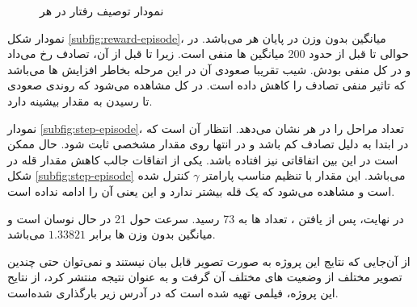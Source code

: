 \begin{figure}
	\centering
	\caption{نمودار توصیف رفتار  در هر }
	\label{fig:episode-chart}
\end{figure}

نمودار شکل \ref{subfig:reward-episode}، میانگین بدون وزن  در پایان هر  می‌باشد. در حوالی تا قبل از حدود 200 میانگین  ها منفی است. زیرا تا قبل از آن، تصادف رخ می‌داد و در کل منفی بودش. شیب تقریبا صعودی آن در این مرحله بخاطر افزایش ها می‌باشد که تاثیر منفی تصادف را کاهش داده است. در کل مشاهده می‌شود که روندی صعودی تا رسیدن به مقدار بیشینه  دارد.

نمودار \ref{subfig:step-episode}، تعداد مراحل را در هر  نشان می‌دهد. انتظار آن است که در ابتدا به دلیل تصادف کم باشد و در انتها روی مقدار مشخصی ثابت شود. حال ممکن است در این بین اتفاقاتی نیز افتاده باشد. یکی از اتفاقات جالب کاهش مقدار قله در شکل \ref{subfig:step-episode} می‌باشد. این مقدار با تنظیم مناسب پارامتر $\gamma$ کنترل شده است و مشاهده می‌شود که یک قله بیشتر ندارد و این یعنی آن  را ادامه نداده است.

در نهایت، پس از یافتن ، تعداد ها به 73 رسید. سرعت  حول 21 در حال نوسان است و میانگین بدون وزن ها برابر $1.33821$ می‌باشد.

از آن‌جایی که نتایج این پروژه به صورت تصویر قابل بیان نیستند و نمی‌توان حتی چندین تصویر مختلف از وضعیت های مختلف آن گرفت و به عنوان نتیجه منتشر کرد، 
از نتایح این پروژه، فیلمی تهیه شده است که در آدرس زیر بارگذاری شده‌است.
\begin{center}
\end{center}

